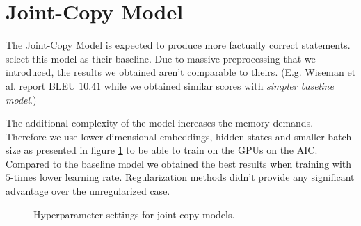 \section{Joint-Copy Model}

The Joint-Copy Model is expected to produce more factually correct statements. \citep{wiseman2017} select this model as their baseline. Due to massive preprocessing that we introduced, the results we obtained aren't comparable to theirs. (E.g. Wiseman et al. report BLEU $10.41$ while we obtained similar scores with \emph{simpler baseline model}.)

The additional complexity of the model increases the memory demands. The\-refore we use lower dimensional embeddings, hidden states and smaller batch size as presented in figure \ref{figure:hyperparameters_copy_low_lr} to be able to train on the GPUs on the AIC. Compared to the baseline model we obtained the best results when training with $5$-times lower learning rate. Regularization methods didn't provide any significant advantage over the unregularized case.

\begin{figure}[h]
    \caption{Hyperparameter settings for joint-copy models.} \label{figure:hyperparameters_copy_low_lr}
\end{figure}

